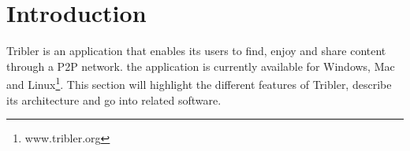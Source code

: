 \section{Introduction}
Tribler is an application that enables its users to find, enjoy and share content through a P2P network. the application is currently available for Windows, Mac and Linux\footnote{www.tribler.org}. This section will highlight the different features of Tribler, describe its architecture and go into related software.
